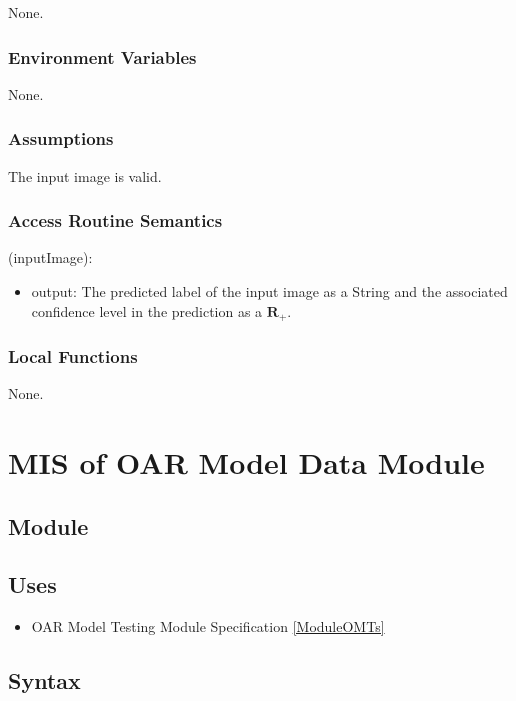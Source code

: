 \documentclass[12pt, titlepage]{article}
\begin{document}
None.

\subsubsection{Environment Variables}

None.

\subsubsection{Assumptions}

The input image is valid.

\subsubsection{Access Routine Semantics}

\noindent {}(inputImage):
\begin{itemize}
\item output: The predicted label of the input image  as a String and the associated confidence level in the 
prediction as a $\mathbf{R}_{+}$.
\end{itemize}

\subsubsection{Local Functions}

None.

\section{MIS of OAR Model Data Module} \label{ModuleOMD} 

\subsection{Module}


\subsection{Uses}

\begin{itemize}
  \item OAR Model Testing Module Specification \ref{ModuleOMTs}
\end{itemize}

\subsection{Syntax}
\end{document}
